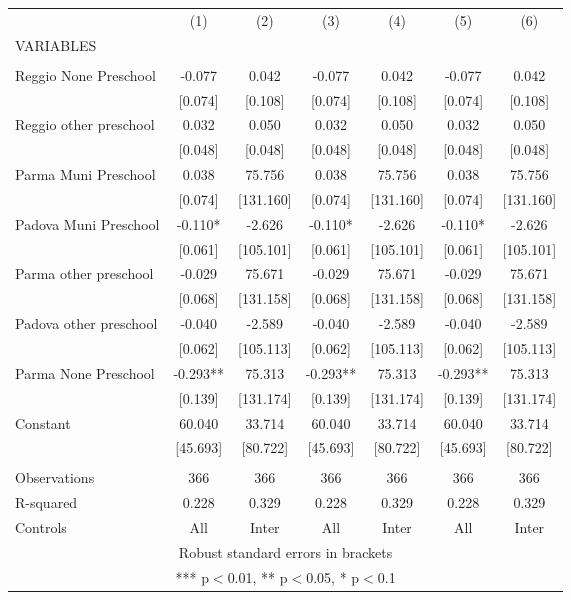 \begin{tabular}{lcccccc} \hline
 & (1) & (2) & (3) & (4) & (5) & (6) \\
VARIABLES &  &  &  &  &  &  \\ \hline
 &  &  &  &  &  &  \\
Reggio None Preschool & -0.077 & 0.042 & -0.077 & 0.042 & -0.077 & 0.042 \\
 & [0.074] & [0.108] & [0.074] & [0.108] & [0.074] & [0.108] \\
Reggio other preschool & 0.032 & 0.050 & 0.032 & 0.050 & 0.032 & 0.050 \\
 & [0.048] & [0.048] & [0.048] & [0.048] & [0.048] & [0.048] \\
Parma Muni Preschool & 0.038 & 75.756 & 0.038 & 75.756 & 0.038 & 75.756 \\
 & [0.074] & [131.160] & [0.074] & [131.160] & [0.074] & [131.160] \\
Padova Muni Preschool & -0.110* & -2.626 & -0.110* & -2.626 & -0.110* & -2.626 \\
 & [0.061] & [105.101] & [0.061] & [105.101] & [0.061] & [105.101] \\
Parma other preschool & -0.029 & 75.671 & -0.029 & 75.671 & -0.029 & 75.671 \\
 & [0.068] & [131.158] & [0.068] & [131.158] & [0.068] & [131.158] \\
Padova other preschool & -0.040 & -2.589 & -0.040 & -2.589 & -0.040 & -2.589 \\
 & [0.062] & [105.113] & [0.062] & [105.113] & [0.062] & [105.113] \\
Parma None Preschool & -0.293** & 75.313 & -0.293** & 75.313 & -0.293** & 75.313 \\
 & [0.139] & [131.174] & [0.139] & [131.174] & [0.139] & [131.174] \\
Constant & 60.040 & 33.714 & 60.040 & 33.714 & 60.040 & 33.714 \\
 & [45.693] & [80.722] & [45.693] & [80.722] & [45.693] & [80.722] \\
 &  &  &  &  &  &  \\
Observations & 366 & 366 & 366 & 366 & 366 & 366 \\
R-squared & 0.228 & 0.329 & 0.228 & 0.329 & 0.228 & 0.329 \\
 Controls & All & Inter & All & Inter & All & Inter \\ \hline
\multicolumn{7}{c}{ Robust standard errors in brackets} \\
\multicolumn{7}{c}{ *** p$<$0.01, ** p$<$0.05, * p$<$0.1} \\
\end{tabular}
